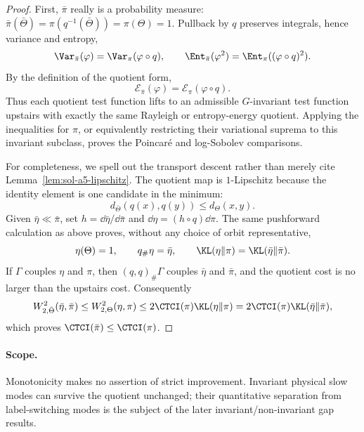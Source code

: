 \documentclass[../main.tex]{subfiles}
\begin{document}
\begin{proof}
First, \(\bar\pi\) really is a probability measure:
\(\bar\pi(\bar\Theta)=\pi(q^{-1}(\bar\Theta))=\pi(\Theta)=1\).  Pullback by \(q\) preserves
integrals, hence variance and entropy,
\[
 \Var_{\bar\pi}(\varphi)=\Var_\pi(\varphi\circ q),
 \qquad
 \Ent_{\bar\pi}(\varphi^2)=\Ent_\pi((\varphi\circ q)^2).
\]
By the definition of the quotient form,
\[
 \mathcal E_{\bar\pi}(\varphi)
 =\mathcal E_\pi(\varphi\circ q).
\]
Thus each quotient test function lifts to an admissible \(G\)-invariant test function upstairs
with exactly the same Rayleigh or entropy-energy quotient.  Applying the inequalities for
\(\pi\), or equivalently restricting their variational suprema to this invariant subclass,
proves the Poincar\'e and log-Sobolev comparisons.

For completeness, we spell out the transport descent rather than merely cite
Lemma~\ref{lem:sol-a5-lipschitz}.  The quotient map is \(1\)-Lipschitz because the identity
element is one candidate in the minimum:
\[
 d_{\bar\Theta}(q(x),q(y))\le d_\Theta(x,y).
\]
Given \(\bar\eta\ll\bar\pi\), set \(h=\dd\bar\eta/\dd\bar\pi\) and
\(\dd\eta=(h\circ q)\dd\pi\).  The same pushforward calculation as above proves, without any
choice of orbit representative,
\[
 \eta(\Theta)=1,
 \qquad q_\#\eta=\bar\eta,
 \qquad \KL(\eta\|\pi)=\KL(\bar\eta\|\bar\pi).
\]
If \(\Gamma\) couples \(\eta\) and \(\pi\), then \((q,q)_\#\Gamma\) couples
\(\bar\eta\) and \(\bar\pi\), and the quotient cost is no larger than the upstairs cost.
Consequently
\[
 W_{2,\bar\Theta}^2(\bar\eta,\bar\pi)
 \le W_{2,\Theta}^2(\eta,\pi)
 \le2\CTCI(\pi)\KL(\eta\|\pi)
 =2\CTCI(\pi)\KL(\bar\eta\|\bar\pi),
\]
which proves \(\CTCI(\bar\pi)\le\CTCI(\pi)\).
\end{proof}

\paragraph{Scope.}
Monotonicity makes no assertion of strict improvement.  Invariant physical slow modes can survive
the quotient unchanged; their quantitative separation from label-switching modes is the subject
of the later invariant/non-invariant gap results.
\end{document}
